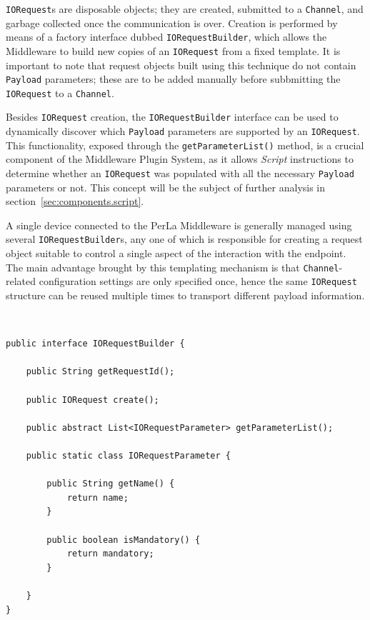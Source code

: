 \texttt{IORequest}s are disposable objects; they are created, submitted to a
\texttt{Channel}, and garbage collected once the communication is over.
Creation is performed by means of a factory interface dubbed
\texttt{IORequestBuilder}, which allows the Middleware to build new copies of
an \texttt{IORequest} from a fixed template. It is important to note that
request objects built using this technique do not contain \texttt{Payload}
parameters; these are to be added manually before subbmitting the
\texttt{IORequest} to a \texttt{Channel}.

Besides \texttt{IORequest} creation, the \texttt{IORequestBuilder} interface
can be used to dynamically discover which \texttt{Payload} parameters are
supported by an \texttt{IORequest}. This functionality, exposed through the
\texttt{getParameterList()} method, is a crucial component of the Middleware
Plugin System, as it allows \textit{Script} instructions to determine whether
an \texttt{IORequest} was populated with all the necessary \texttt{Payload}
parameters or not. This concept will be the subject of further analysis in
section~\ref{sec:components.script}.

A single device connected to the PerLa Middleware is generally managed using
several \texttt{IORequestBuilder}s, any one of which is responsible for
creating a request object suitable to control a single aspect of
the interaction with the endpoint. The main advantage brought by this
templating mechanism is that \texttt{Channel}-related configuration settings
are only specified once, hence the same \texttt{IORequest} structure can be
reused multiple times to transport different payload information.

~\\
\lstset{language=Java}
\begin{lstlisting}[floatplacement=!hbt,caption=The IORequestBuilder
interface,label={lst:iorequestbuilder}]
public interface IORequestBuilder {

	public String getRequestId();

	public IORequest create();

	public abstract List<IORequestParameter> getParameterList();

	public static class IORequestParameter {

		public String getName() {
			return name;
		}

		public boolean isMandatory() {
			return mandatory;
		}

	}
}
\end{lstlisting}

